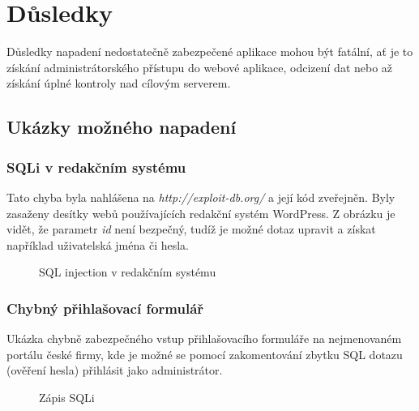 \chapter{Důsledky}
Důsledky napadení nedostatečně zabezpečené aplikace mohou být fatální, ať je to získání administrátorského přístupu do webové aplikace, odcizení dat nebo až získání úplné kontroly nad cílovým serverem.

\section{Ukázky možného napadení}
\subsection{SQLi v redakčním systému}
Tato chyba byla nahlášena na \textit{http://exploit-db.org/} a její kód zveřejněn. Byly zasaženy desítky webů používajících redakční systém WordPress. Z obrázku je vidět, že parametr \textit{id} není bezpečný, tudíž je možné dotaz upravit a získat například uživatelská jména či  hesla.
\begin{figure}[h!]
\caption{SQL injection v redakčním systému}
\label{obr.squash}
\end{figure}

\subsection{Chybný přihlašovací formulář}
Ukázka chybně zabezpečného vstup přihlašovacího formuláře na nejmenovaném portálu české firmy, kde je možné se pomocí zakomentování zbytku SQL dotazu (ověření hesla) přihlásit jako administrátor.
\begin{figure}[h!]
\caption{Zápis SQLi}
\label{obr.login1}
\end{figure}

